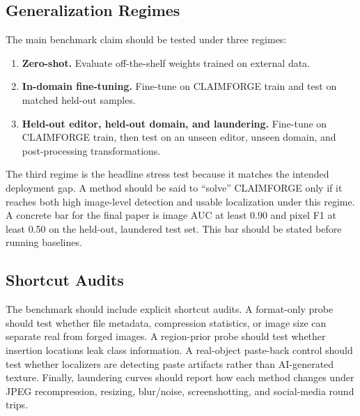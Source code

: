 \subsection{Generalization Regimes}

The main benchmark claim should be tested under three regimes:
\begin{enumerate}
    \item \textbf{Zero-shot.} Evaluate off-the-shelf weights trained on external data.
    \item \textbf{In-domain fine-tuning.} Fine-tune on CLAIMFORGE train and test on matched held-out samples.
    \item \textbf{Held-out editor, held-out domain, and laundering.} Fine-tune on CLAIMFORGE train, then test on an unseen editor, unseen domain, and post-processing transformations.
\end{enumerate}
The third regime is the headline stress test because it matches the intended deployment gap. A method should be said to ``solve'' CLAIMFORGE only if it reaches both high image-level detection and usable localization under this regime. A concrete bar for the final paper is image AUC at least 0.90 and pixel F1 at least 0.50 on the held-out, laundered test set. This bar should be stated before running baselines.

\subsection{Shortcut Audits}

The benchmark should include explicit shortcut audits. A format-only probe should test whether file metadata, compression statistics, or image size can separate real from forged images. A region-prior probe should test whether insertion locations leak class information. A real-object paste-back control should test whether localizers are detecting paste artifacts rather than AI-generated texture. Finally, laundering curves should report how each method changes under JPEG recompression, resizing, blur/noise, screenshotting, and social-media round trips.
